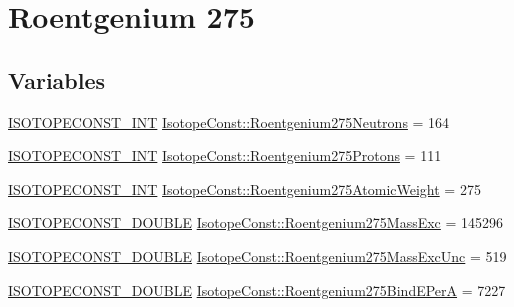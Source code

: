 \hypertarget{group___isotope_const-_roentgenium-_rg275}{}\section{Roentgenium 275}
\label{group___isotope_const-_roentgenium-_rg275}
\subsection*{Variables}
\begin{DoxyCompactItemize}
\item 
\mbox{\hyperlink{group___isotope_const-_macros_ga5f18360b3e99483a35c32d789e62621c}{I\+S\+O\+T\+O\+P\+E\+C\+O\+N\+S\+T\+\_\+\+I\+NT}} \mbox{\hyperlink{group___isotope_const-_roentgenium-_rg275_ga46091bb8103e5b14060002608d0a119f}{Isotope\+Const\+::\+Roentgenium275\+Neutrons}} = 164
\item 
\mbox{\hyperlink{group___isotope_const-_macros_ga5f18360b3e99483a35c32d789e62621c}{I\+S\+O\+T\+O\+P\+E\+C\+O\+N\+S\+T\+\_\+\+I\+NT}} \mbox{\hyperlink{group___isotope_const-_roentgenium-_rg275_ga04d3e79a8019b1bd6056e8a75924678b}{Isotope\+Const\+::\+Roentgenium275\+Protons}} = 111
\item 
\mbox{\hyperlink{group___isotope_const-_macros_ga5f18360b3e99483a35c32d789e62621c}{I\+S\+O\+T\+O\+P\+E\+C\+O\+N\+S\+T\+\_\+\+I\+NT}} \mbox{\hyperlink{group___isotope_const-_roentgenium-_rg275_ga39cca6116076b99f08b5aafb64375967}{Isotope\+Const\+::\+Roentgenium275\+Atomic\+Weight}} = 275
\item 
\mbox{\hyperlink{group___isotope_const-_macros_ga8f45a7272ce02c0b4c65c44636ed719a}{I\+S\+O\+T\+O\+P\+E\+C\+O\+N\+S\+T\+\_\+\+D\+O\+U\+B\+LE}} \mbox{\hyperlink{group___isotope_const-_roentgenium-_rg275_ga7dd1412c616f7862a40640083d4a452f}{Isotope\+Const\+::\+Roentgenium275\+Mass\+Exc}} = 145296
\item 
\mbox{\hyperlink{group___isotope_const-_macros_ga8f45a7272ce02c0b4c65c44636ed719a}{I\+S\+O\+T\+O\+P\+E\+C\+O\+N\+S\+T\+\_\+\+D\+O\+U\+B\+LE}} \mbox{\hyperlink{group___isotope_const-_roentgenium-_rg275_ga22ea93db7cab0ff5e52eb8c56f903c91}{Isotope\+Const\+::\+Roentgenium275\+Mass\+Exc\+Unc}} = 519
\item 
\mbox{\hyperlink{group___isotope_const-_macros_ga8f45a7272ce02c0b4c65c44636ed719a}{I\+S\+O\+T\+O\+P\+E\+C\+O\+N\+S\+T\+\_\+\+D\+O\+U\+B\+LE}} \mbox{\hyperlink{group___isotope_const-_roentgenium-_rg275_ga17791f9bbd6ef1076ae6e89c8e3ae910}{Isotope\+Const\+::\+Roentgenium275\+Bind\+E\+PerA}} = 7227

\end{DoxyCompactItemize}
